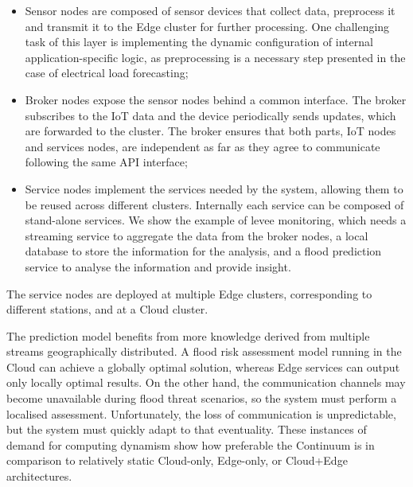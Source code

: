 \begin{itemize}
    \item Sensor nodes are composed of sensor devices that collect data, preprocess it and transmit it to the Edge cluster for further processing. One challenging task of this layer is implementing the dynamic configuration of internal application-specific logic, as preprocessing is a necessary step presented in the case of electrical load forecasting;
    \item Broker nodes expose the sensor nodes behind a common interface. The broker subscribes to the IoT data and the device periodically sends updates, which are forwarded to the cluster. The broker ensures that both parts, IoT nodes and services nodes, are independent as far as they agree to communicate following the same API interface;
    \item Service nodes implement the services needed by the system, allowing them to be reused across different clusters. Internally each service can be composed of stand-alone services. We show the example of levee monitoring, which needs a streaming service to aggregate the data from the broker nodes, a local database to store the information for the analysis, and a flood prediction service to analyse the information and provide insight. 
\end{itemize}

The service nodes are deployed at multiple Edge clusters, corresponding to different stations, and at a Cloud cluster.


The prediction model benefits from more knowledge derived from multiple streams geographically distributed. A flood risk assessment model running in the Cloud can achieve a globally optimal solution, whereas Edge services can output only locally optimal results. On the other hand, the communication channels may become unavailable during flood threat scenarios, so the system must perform a localised assessment. Unfortunately, the loss of communication is unpredictable, but the system must quickly adapt to that eventuality. These instances of demand for computing dynamism show how preferable the Continuum is in comparison to relatively static Cloud-only, Edge-only, or Cloud+Edge architectures.

